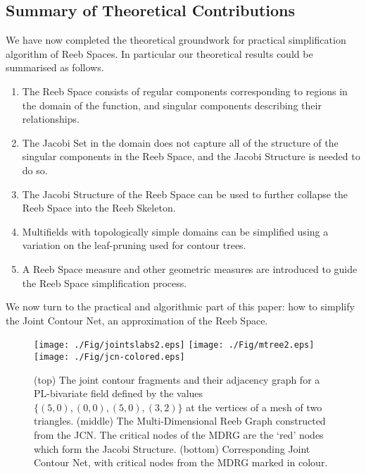 \documentclass[twocolumn]{article}
\begin{document}
\subsection{Summary of Theoretical Contributions}
\label{sec:mathSummary}

We have now completed the theoretical groundwork for practical
simplification algorithm of Reeb Spaces. In particular our theoretical
results could be summarised as follows.

\begin{enumerate}\itemsep1pt
	\item	The Reeb Space consists of regular components corresponding to regions in the domain
			of the function, and singular components describing their relationships.
	\item	The Jacobi Set in the domain does not capture all of the structure of the singular
			components in the Reeb Space, and the Jacobi Structure is needed to do so.
	\item	The Jacobi Structure of the Reeb Space can be used to
          further collapse the Reeb Space into the Reeb 
			Skeleton.
	\item	Multifields with topologically simple domains can be
          simplified using a variation on the leaf-pruning used for
          contour trees. 
	\item	A Reeb Space measure and other geometric measures are introduced to guide
          the Reeb Space simplification process.
\end{enumerate}

We now turn to the practical and algorithmic part of this paper: how to simplify
the Joint Contour Net, an approximation of the Reeb Space. 

%
 \begin{figure}
\begin{center}
\texttt{[image: ./Fig/jointslabs2.eps]}
\vspace{1cm}
\texttt{[image: ./Fig/mtree2.eps]}
\vspace{1cm}
\texttt{[image: ./Fig/jcn-colored.eps]}
\end{center}
\caption{ (top) The joint contour fragments and their adjacency graph
  for a PL-bivariate field defined by the values $\{(5,
  0), (0, 0), (5, 0), (3, 2)\}$ at the vertices of
  a mesh of two triangles. 
(middle) The Multi-Dimensional Reeb Graph constructed from the
  JCN. The critical nodes of the MDRG are the `red' nodes which form the
  Jacobi Structure.  
  (bottom)  Corresponding Joint Contour Net, with
  critical nodes from the MDRG marked in colour.
}
\label{fig:mdrg}
\end{figure} 
\end{document}
